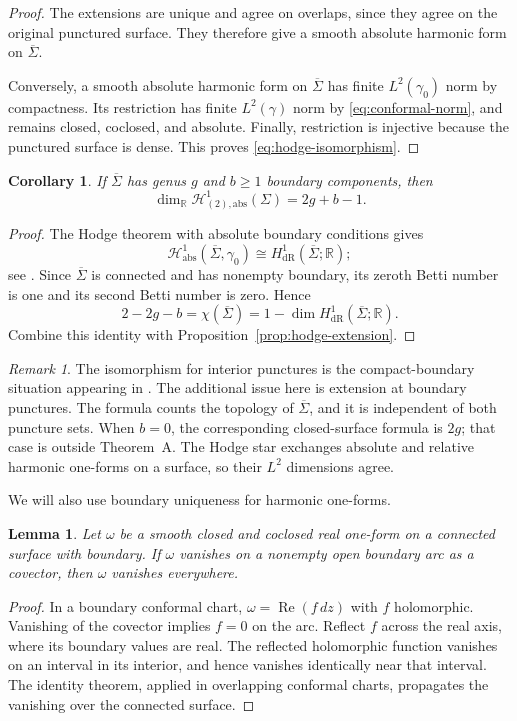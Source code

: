 \documentclass[11pt]{amsart}
\numberwithin{equation}{section}
\newtheorem{lemma}[theorem]{Lemma}
\newtheorem{corollary}[theorem]{Corollary}
\theoremstyle{definition}
\theoremstyle{remark}
\newtheorem{remark}[theorem]{Remark}
\newcommand{\R}{\mathbb R}
\newcommand{\HH}{\mathcal H}
\newcommand{\Sigmabar}{\overline\Sigma}
\newcommand{\dd}{\,d}
\DeclareMathOperator{\Rea}{Re}
\begin{document}
\begin{proof}
The extensions are unique and agree on overlaps, since they agree on the original punctured surface. They therefore give a smooth absolute harmonic form on $\Sigmabar$.

Conversely, a smooth absolute harmonic form on $\Sigmabar$ has finite $L^2(\gamma_0)$ norm by compactness. Its restriction has finite $L^2(\gamma)$ norm by \eqref{eq:conformal-norm}, and remains closed, coclosed, and absolute. Finally, restriction is injective because the punctured surface is dense. This proves \eqref{eq:hodge-isomorphism}.
\end{proof}

\begin{corollary}\label{cor:hodge-dimension}
If $\Sigmabar$ has genus $g$ and $b\ge1$ boundary components, then
\begin{equation}\label{eq:hodge-dimension}
\dim_{\R}\HH^1_{(2),\mathrm{abs}}(\Sigma)=2g+b-1.
\end{equation}
\end{corollary}
\begin{proof}
The Hodge theorem with absolute boundary conditions gives
\[
\HH^1_{\mathrm{abs}}(\Sigmabar,\gamma_0)
\cong H^1_{\mathrm{dR}}(\Sigmabar;\R);
\]
see \cite{Schwarz95}. Since $\Sigmabar$ is connected and has nonempty boundary, its zeroth Betti number is one and its second Betti number is zero. Hence
\[
2-2g-b=\chi(\Sigmabar)=1-\dim H^1_{\mathrm{dR}}(\Sigmabar;\R).
\]
Combine this identity with Proposition~\ref{prop:hodge-extension}.
\end{proof}

\begin{remark}
The isomorphism for interior punctures is the compact-boundary situation appearing in \cite{CMS26}. The additional issue here is extension at boundary punctures. The formula counts the topology of $\Sigmabar$, and it is independent of both puncture sets. When $b=0$, the corresponding closed-surface formula is $2g$; that case is outside Theorem~A. The Hodge star exchanges absolute and relative harmonic one-forms on a surface, so their $L^2$ dimensions agree.
\end{remark}
We will also use boundary uniqueness for harmonic one-forms.
\begin{lemma}\label{lem:boundary-uniqueness}
Let $\omega$ be a smooth closed and coclosed real one-form on a connected surface with boundary. If $\omega$ vanishes on a nonempty open boundary arc as a covector, then $\omega$ vanishes everywhere.
\end{lemma}
\begin{proof}
In a boundary conformal chart, $\omega=\Rea(f\dd z)$ with $f$ holomorphic. Vanishing of the covector implies $f=0$ on the arc. Reflect $f$ across the real axis, where its boundary values are real. The reflected holomorphic function vanishes on an interval in its interior, and hence vanishes identically near that interval. The identity theorem, applied in overlapping conformal charts, propagates the vanishing over the connected surface.
\end{proof}
\end{document}
